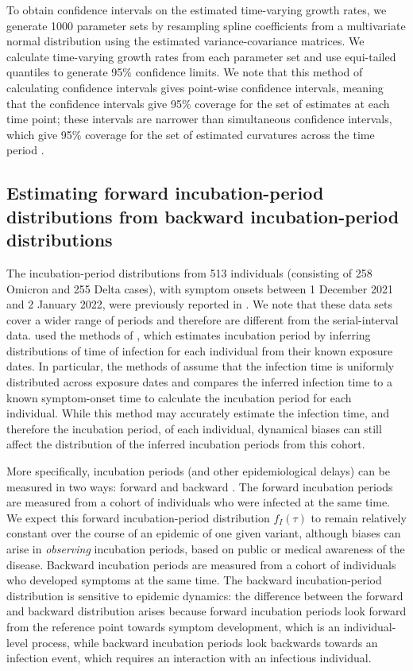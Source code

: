 \documentclass[12pt]{article}
\begin{document}
To obtain confidence intervals on the estimated time-varying growth rates, we generate 1000 parameter sets by resampling spline coefficients from a multivariate normal distribution using the estimated variance-covariance matrices.
We calculate time-varying growth rates from each parameter set and use equi-tailed quantiles to generate 95\% confidence limits. 
We note that this method of calculating confidence intervals gives point-wise confidence intervals, meaning that the confidence intervals give 95\% coverage for the set of estimates at each time point;
these intervals are narrower than simultaneous confidence intervals, which give 95\% coverage for the set of estimated curvatures across the time period \citep{simpson2017}.

\subsection{Estimating forward incubation-period distributions from backward incubation-period distributions}

The incubation-period distributions from 513 individuals (consisting of 258 Omicron and 255 Delta cases), with symptom onsets between 1 December 2021 and 2 January 2022, were previously reported in \cite{backer2021omicron}.
We note that these data sets cover a wider range of periods and therefore are different from the serial-interval data.
\cite{backer2021omicron} used the methods of \cite{backer2020incubation}, which estimates incubation period by inferring distributions of time of infection for each individual from their known exposure dates.
In particular, the methods of \cite{backer2020incubation} assume that the infection time is uniformly distributed across exposure dates and compares the inferred infection time to a known symptom-onset time to calculate the incubation period for each individual.
While this method may accurately estimate the infection time, and therefore the incubation period, of each individual, dynamical biases can still affect the distribution of the inferred incubation periods from this cohort.

More specifically, incubation periods (and other epidemiological delays) can be measured in two ways: forward and backward \citep{park2021forward}.
The forward incubation periods are measured from a cohort of individuals who were infected at the same time. 
We expect this forward incubation-period distribution $f_I(\tau)$ to remain relatively constant over the course of an epidemic of one given variant, although biases can arise in \emph{observing} incubation periods, based on public or medical awareness of the disease. 
Backward incubation periods are measured from a cohort of individuals who developed symptoms at the same time. 
The backward incubation-period distribution is sensitive to epidemic dynamics:
the difference between the forward and backward distribution arises because forward incubation periods look forward from the reference point towards symptom development, which is an individual-level process, while backward incubation periods look backwards towards an infection event, which requires an interaction with an infectious individual.
\end{document}
